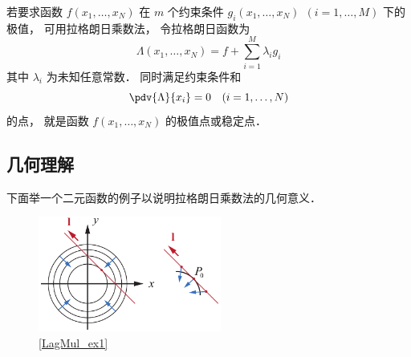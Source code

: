 

若要求函数 $f(x_1,\dots, x_N)$ 在 $m$ 个约束条件 $g_i(x_1, \dots, x_N)\ \ (i = 1,\dots, M)$ 下的极值， 可用拉格朗日乘数法， 令拉格朗日函数为
\begin{equation}
\Lambda(x_1,\dots, x_N) = f + \sum_{i=1}^M \lambda_i g_i
\end{equation} 
其中 $\lambda_i$ 为未知任意常数． 同时满足约束条件和
\begin{equation}
\pdv{\Lambda}{x_i} = 0 \quad (i = 1,\dots, N)
\end{equation}
的点， 就是函数 $f(x_1, \dots, x_N)$ 的极值点或稳定点．

\subsection{几何理解}

下面举一个二元函数的例子以说明拉格朗日乘数法的几何意义．

\begin{figure}[ht]
\centering
\includegraphics[width=6cm]{./figures/LagMul_1.pdf}
\caption{\autoref{LagMul_ex1}} \label{LagMul_fig1}
\end{figure}


